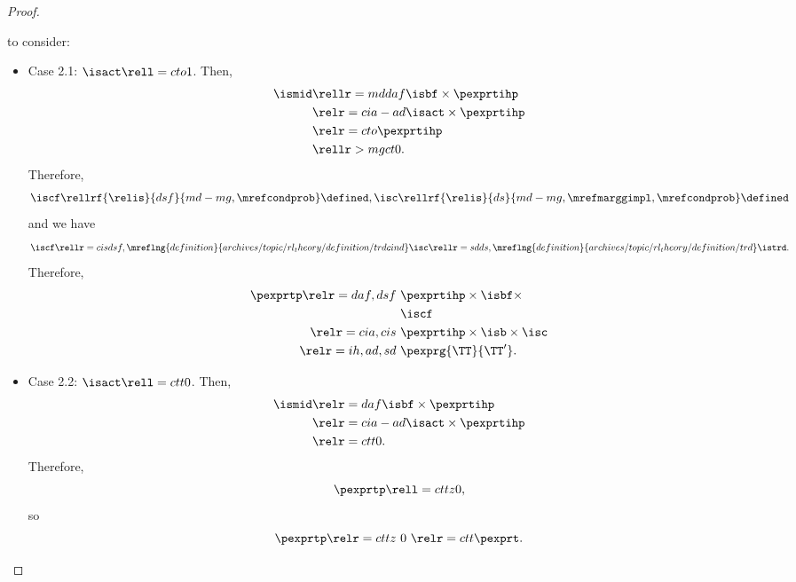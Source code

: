 \begin{proof}
\begin{itemize}
       to consider:
      \begin{itemize}
        \item Case 2.1: $\isact \rell = cto 1$.
          Then,
          \begin{align*}
            \ismid &\rellr = md daf \isbf \times \pexprtihp\\
                   &\relr = cia-ad \isact \times \pexprtihp\\
                   &\relr = cto \pexprtihp\\
                   &\rellr > mg ct 0.
          \end{align*}
          Therefore, 
          $$\iscf \rellrf{\relis}{dsf}{md-mg,\mrefcondprob} \defined,\isc \rellrf{\relis}{ds}{md-mg,\mrefmarggimpl,\mrefcondprob} \defined$$
          and we have
          $$\iscf 
          \rellr = cis dsf,\mreflng{definition}{archives/topic/rl_theory/definition/trdcind} \isc 
          \rellr = sd ds,\mreflng{definition}{archives/topic/rl_theory/definition/trd} \istrd.$$
          Therefore,
          \begin{align*}
            \pexprtp 
            \relr = daf,dsf \ & \pexprtihp \times \isbf \times\\& \iscf\\
            \relr = cia,cis \ & \pexprtihp \times \isb \times \isc\\
            \relr = ih,ad,sd \ & \pexprg{\TT}{\TT'}.
          \end{align*}
        \item Case 2.2: $\isact \rell = ctt 0$.
          Then,
          \begin{align*}
            \ismid &\relr = daf \isbf \times \pexprtihp\\
                   &\relr = cia-ad \isact \times \pexprtihp\\
                   &\relr = ctt 0.
          \end{align*}
          Therefore,
          $$\pexprtp \rell = cttz 0,$$
          so
          $$\pexprtp
          \relr = cttz \ 0 \ 
          \relr = ctt \pexprt.$$
      \end{itemize}
  \end{itemize}
\end{proof}
